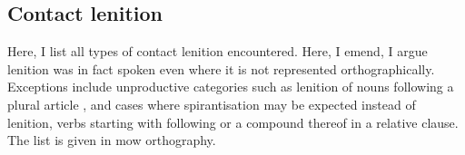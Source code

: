 
\subsection{Contact lenition}
\label{sec:contact-lenition-1}

Here, I list all types of contact lenition encountered. Here, I emend, \ie I argue lenition was in fact spoken even where it is not represented orthographically. Exceptions include unproductive categories such as lenition of nouns following a plural article \eg {}, and cases where spirantisation may be expected instead of lenition, \eg verbs starting with  following  or a compound thereof in a relative clause. The list is given in \gls{mow} orthography. 

